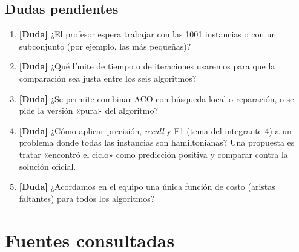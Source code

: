 \documentclass[11pt,letterpaper]{article}
\theoremstyle{definition}
\newcommand{\duda}{\textcolor{red!60!black}{\textbf{[Duda]}}}
\begin{document}
\subsection{Dudas pendientes}
\begin{enumerate}[nosep]
  \item \duda{} ¿El profesor espera trabajar con las 1001 instancias o con un subconjunto
        (por ejemplo, las más pequeñas)?
  \item \duda{} ¿Qué límite de tiempo o de iteraciones usaremos para que la comparación sea
        justa entre los seis algoritmos?
  \item \duda{} ¿Se permite combinar ACO con búsqueda local o reparación, o se pide la
        versión «pura» del algoritmo?
  \item \duda{} ¿Cómo aplicar precisión, \emph{recall} y F1 (tema del integrante 4) a un
        problema donde todas las instancias son hamiltonianas? Una propuesta es tratar
        «encontró el ciclo» como predicción positiva y comparar contra la solución oficial.
  \item \duda{} ¿Acordamos en el equipo una única función de costo (aristas faltantes) para
        todos los algoritmos?
\end{enumerate}

\section{Fuentes consultadas}
\label{sec:fuentes}
\end{document}

